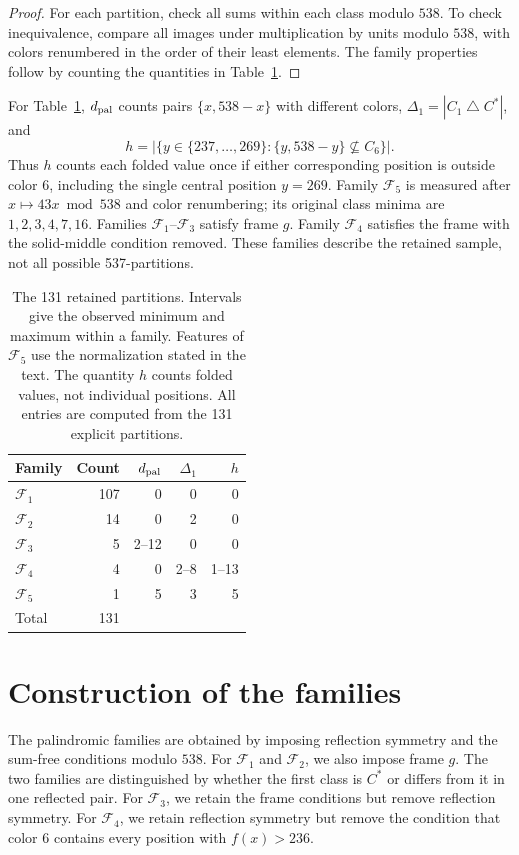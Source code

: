 \documentclass[11pt,a4paper]{article}
\theoremstyle{definition}
\begin{document}
\begin{proof}
For each partition, check all sums within each class modulo $538$.
To check inequivalence, compare all images under multiplication by units modulo
$538$, with colors renumbered in the order of their least elements.
The family properties follow by counting the quantities in Table~\ref{tab:families}.
\end{proof}

For Table~\ref{tab:families}, $d_{\rm pal}$ counts pairs $\{x,538-x\}$
with different colors, $\Delta_1=|C_1\mathbin{\triangle}C^*|$, and
\[
h=\bigl|\{y\in\{237,\dots,269\}:\{y,538-y\}\not\subseteq C_6\}\bigr|.
\]
Thus $h$ counts each folded value once if either corresponding position is
outside color 6, including the single central position $y=269$.
Family $\mathcal F_5$ is measured after
$x\mapsto43x\bmod538$ and color renumbering; its original class minima are
$1,2,3,4,7,16$. Families $\mathcal F_1$--$\mathcal F_3$ satisfy frame $g$.
Family $\mathcal F_4$ satisfies the frame with the solid-middle condition removed.
These families describe the retained sample, not all possible 537-partitions.

\begin{table}[tbp]
\caption{The 131 retained partitions. Intervals give the observed minimum and
maximum within a family. Features of $\mathcal F_5$ use the normalization stated
in the text. The quantity $h$ counts folded values, not individual positions.
All entries are computed from the 131 explicit partitions.}
\label{tab:families}
\centering
\begin{tabular}{lrrrr}
\toprule
Family & Count & $d_{\rm pal}$ & $\Delta_1$ & $h$\\
\midrule
$\mathcal F_1$ & 107 & 0 & 0 & 0\\
$\mathcal F_2$ & 14  & 0 & 2 & 0\\
$\mathcal F_3$ & 5   & 2--12 & 0 & 0\\
$\mathcal F_4$ & 4   & 0 & 2--8 & 1--13\\
$\mathcal F_5$ & 1   & 5 & 3 & 5\\
\midrule
Total & 131 & & &\\
\bottomrule
\end{tabular}
\end{table}

\section{Construction of the families}\label{sec:method}
The palindromic families are obtained by imposing reflection symmetry and the
sum-free conditions modulo $538$. For $\mathcal F_1$ and $\mathcal F_2$, we also
impose frame $g$. The two families are distinguished by whether the first class
is $C^*$ or differs from it in one reflected pair. For $\mathcal F_3$, we retain
the frame conditions but remove reflection symmetry. For $\mathcal F_4$, we
retain reflection symmetry but remove the condition that color 6 contains every
position with $f(x)>236$.
\end{document}

